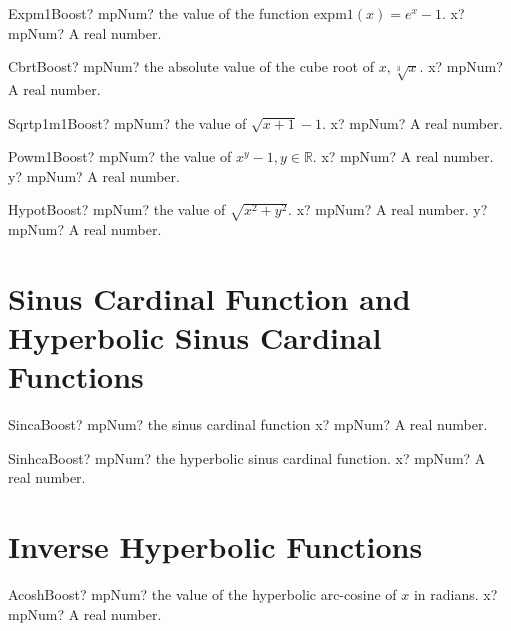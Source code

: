 \documentclass[12pt,a4paper,openany]{book}
\begin{document}
\begin{mpFunctionsExtract}
\mpFunctionOne
{Expm1Boost? mpNum? the value of the function $\text{expm1}(x) = e^{x}-1$.}
{x? mpNum? A real number.}
\end{mpFunctionsExtract}

\begin{mpFunctionsExtract}
\mpFunctionOne
{CbrtBoost? mpNum? the absolute value of the cube root of $x, \sqrt[3]{x}$.}
{x? mpNum? A real number.}
\end{mpFunctionsExtract}

\begin{mpFunctionsExtract}
\mpFunctionOne
{Sqrtp1m1Boost? mpNum? the value of $\sqrt{x+1}-1$.}
{x? mpNum? A real number.}
\end{mpFunctionsExtract}

\begin{mpFunctionsExtract}
\mpFunctionTwo
{Powm1Boost? mpNum? the value of $x^y-1, y \in  \mathbb{R}$.}
{x? mpNum? A real number.}
{y? mpNum? A real number.}
\end{mpFunctionsExtract}

\begin{mpFunctionsExtract}
\mpFunctionTwo
{HypotBoost? mpNum? the value of $\sqrt{x^2+y^2}$.}
{x? mpNum? A real number.}
{y? mpNum? A real number.}
\end{mpFunctionsExtract}

\section{Sinus Cardinal Function and Hyperbolic Sinus Cardinal Functions}

\begin{mpFunctionsExtract}
\mpFunctionOne
{SincaBoost? mpNum? the sinus cardinal function}
{x? mpNum? A real number.}
\end{mpFunctionsExtract}

\begin{mpFunctionsExtract}
\mpFunctionOne
{SinhcaBoost? mpNum? the hyperbolic sinus cardinal function.}
{x? mpNum? A real number.}
\end{mpFunctionsExtract}

\section{Inverse Hyperbolic Functions}

\begin{mpFunctionsExtract}
\mpFunctionOne
{AcoshBoost? mpNum? the value of the hyperbolic arc-cosine  of $x$ in radians.}
{x? mpNum? A real number.}
\end{mpFunctionsExtract}
\end{document}
